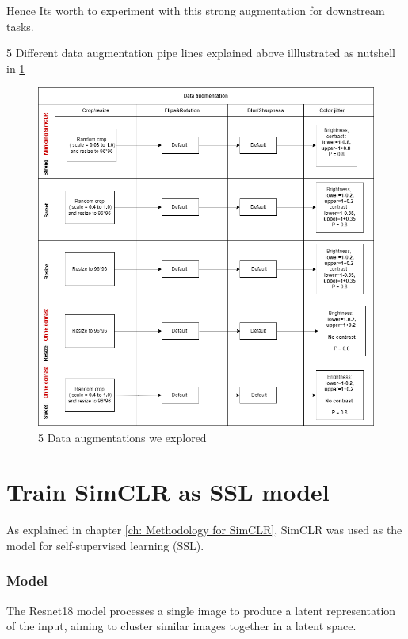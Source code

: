 Hence Its worth to experiment with this strong augmentation for downstream tasks.


5 Different data augmentation pipe lines explained above illlustrated as nutshell in \ref{fig:strong_aug}
\begin{figure}[H]
  \centering
  \includegraphics[scale=0.6]{figures/strong_aug.png} 
  \caption{5 Data augmentations we explored}
  \label{fig:strong_aug}
\end{figure}



\section{Train SimCLR as SSL model}

 As explained in chapter \ref{ch: Methodology for SimCLR}, SimCLR was used as the  model for self-supervised learning (SSL). 




\subsubsection{Model}
The Resnet18 \cite{he2015deepresiduallearningimage} model processes a single image to produce a latent representation of the input, aiming to cluster 
similar images together in a latent space. 

